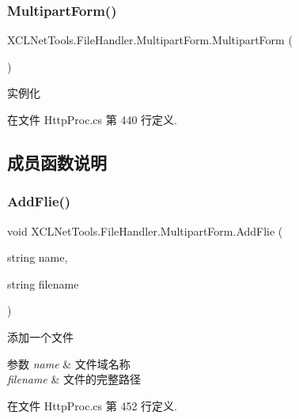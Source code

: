 \subsubsection{\texorpdfstring{Multipart\+Form()}{MultipartForm()}}
{\footnotesize\ttfamily X\+C\+L\+Net\+Tools.\+File\+Handler.\+Multipart\+Form.\+Multipart\+Form (\begin{DoxyParamCaption}{ }\end{DoxyParamCaption})}



实例化 



在文件 Http\+Proc.\+cs 第 440 行定义.



\subsection{成员函数说明}
\mbox{\label{class_x_c_l_net_tools_1_1_file_handler_1_1_multipart_form_af2601517bb4cafc5c9648945ed3e5572}} 
\subsubsection{\texorpdfstring{Add\+Flie()}{AddFlie()}\hspace{0.1cm}{\footnotesize\ttfamily [1/2]}}
{\footnotesize\ttfamily void X\+C\+L\+Net\+Tools.\+File\+Handler.\+Multipart\+Form.\+Add\+Flie (\begin{DoxyParamCaption}\item[{string}]{name,  }\item[{string}]{filename }\end{DoxyParamCaption})}



添加一个文件 


\begin{DoxyParams}{参数}
{\em name} & 文件域名称\\
\hline
{\em filename} & 文件的完整路径\\
\hline
\end{DoxyParams}


在文件 Http\+Proc.\+cs 第 452 行定义.

